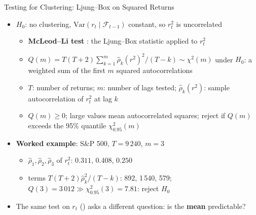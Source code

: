 \begin{frame}{Testing for Clustering: Ljung--Box on Squared Returns}
\itemsize{\small}
\begin{itemize}
    \item $H_0$: no clustering, $\mathrm{Var}(r_t \mid \mathcal{F}_{t-1})$ constant, so $r_t^2$ is uncorrelated
    \begin{itemize}
        \item \textbf{McLeod--Li test} : the Ljung--Box statistic  applied to $r_t^2$
        \item $Q(m) = T(T+2)\sum_{k=1}^m \hat\rho_k(r^2)^2/(T-k) \sim \chi^2(m)$ under $H_0$: a weighted sum of the first $m$ squared autocorrelations
        \item $T$: number of returns; $m$: number of lags tested; $\hat\rho_k(r^2)$: sample autocorrelation of $r_t^2$ at lag $k$
        \item $Q(m) \ge 0$; large values mean autocorrelated squares; reject if $Q(m)$ exceeds the 95\% quantile $\chi^2_{0.95}(m)$
    \end{itemize}
    \item \textbf{Worked example}: S\&P 500, $T = 9\,240$, $m = 3$
    \begin{itemize}
        \item $\hat\rho_1, \hat\rho_2, \hat\rho_3$ of $r_t^2$: $0.311$, $0.408$, $0.250$
        \item terms $T(T+2)\hat\rho_k^2/(T-k)$: 892, 1\,540, 579; $Q(3) = 3\,012 \gg \chi^2_{0.95}(3) = 7.81$: reject $H_0$
    \end{itemize}
    \item The same test on $r_t$ () asks a different question: is the \textbf{mean} predictable?
\end{itemize}
\end{frame}

